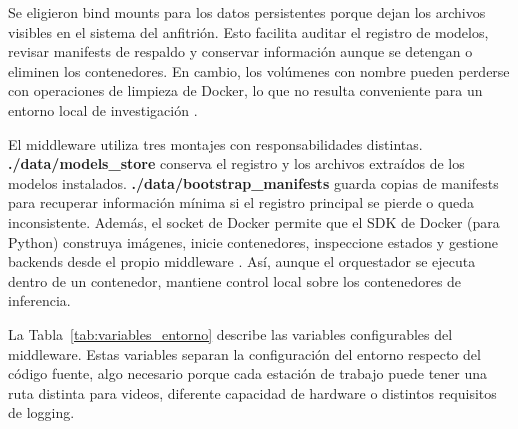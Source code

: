 Se eligieron bind mounts para los datos persistentes porque dejan los archivos visibles en el sistema del anfitrión. Esto facilita auditar el registro de modelos, revisar manifests de respaldo y conservar información aunque se detengan o eliminen los contenedores. En cambio, los volúmenes con nombre pueden perderse con operaciones de limpieza de Docker, lo que no resulta conveniente para un entorno local de investigación \cite{docker2026overview}.

El middleware utiliza tres montajes con responsabilidades distintas. \textbf{./data/models\_store} conserva el registro y los archivos extraídos de los modelos instalados. \textbf{./data/bootstrap\_manifests} guarda copias de manifests para recuperar información mínima si el registro principal se pierde o queda inconsistente. Además, el socket de Docker permite que el SDK de Docker (para Python) construya imágenes, inicie contenedores, inspeccione estados y gestione backends desde el propio middleware \cite{docker_sdk_python}. Así, aunque el orquestador se ejecuta dentro de un contenedor, mantiene control local sobre los contenedores de inferencia.

La Tabla~\ref{tab:variables_entorno} describe las variables configurables del middleware. Estas variables separan la configuración del entorno respecto del código fuente, algo necesario porque cada estación de trabajo puede tener una ruta distinta para videos, diferente capacidad de hardware o distintos requisitos de logging.

